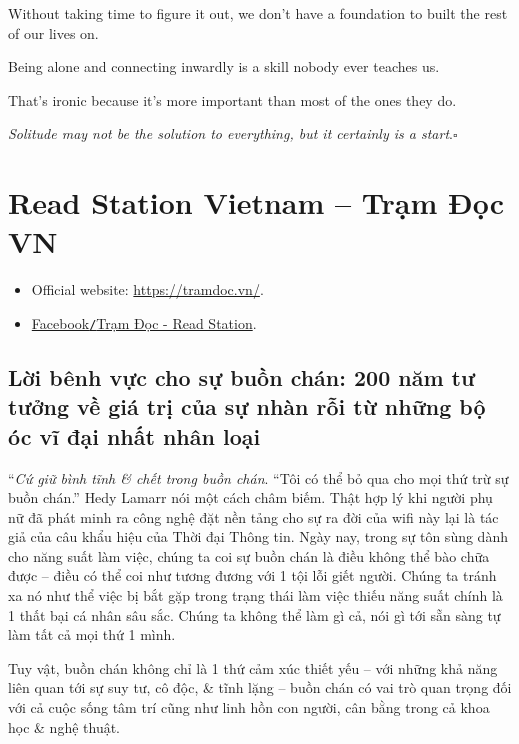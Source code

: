 \documentclass{article}
\begin{document}
Without taking time to figure it out, we don't have a foundation to built the rest of our lives on.

%
Being alone and connecting inwardly is a skill nobody ever teaches us.

That's ironic because it's more important than most of the ones they do.

%
\textit{Solitude may not be the solution to everything, but it certainly is a start}.\hfill$\square$








\section{Read Station Vietnam -- Trạm Đọc VN}

\begin{itemize}
	\item Official website: \url{https://tramdoc.vn/}.
	\item \href{https://www.facebook.com/tramdoc.vn}{Facebook{\tt/}Trạm Đọc - Read Station}.
\end{itemize}

\subsection{Lời bênh vực cho sự buồn chán: 200 năm tư tưởng về giá trị của sự nhàn rỗi từ những bộ óc vĩ đại nhất nhân loại}
``{\it Cứ giữ bình tĩnh \& chết trong buồn chán}. ``Tôi có thể bỏ qua cho mọi thứ trừ sự buồn chán.'' {\sc Hedy Lamarr} nói một cách châm biếm. Thật hợp lý khi người phụ nữ đã phát minh ra công nghệ đặt nền tảng cho sự ra đời của wifi này lại là tác giả của câu khẩu hiệu của Thời đại Thông tin. Ngày nay, trong sự tôn sùng dành cho năng suất làm việc, chúng ta coi sự buồn chán là điều không thể bào chữa được -- điều có thể coi như tương đương với 1 tội lỗi giết người. Chúng ta tránh xa nó như thể việc bị bắt gặp trong trạng thái làm việc thiếu năng suất chính là 1 thất bại cá nhân sâu sắc. Chúng ta không thể làm gì cả, nói gì tới sẵn sàng tự làm tất cả mọi thứ 1 mình.

Tuy vật, buồn chán không chỉ là 1 thứ cảm xúc thiết yếu -- với những khả năng liên quan tới sự suy tư, cô độc, \& tĩnh lặng -- buồn chán có vai trò quan trọng đối với cả cuộc sống tâm trí cũng như linh hồn con người, cân bằng trong cả khoa học \& nghệ thuật.
\end{document}
